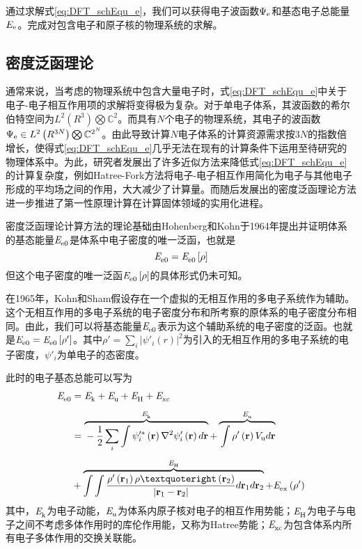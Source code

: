 通过求解式\ref{eq:DFT_schEqu_e}，我们可以获得电子波函数$\Psi_{\rm e}$和基态电子总能量$E_{\rm e}$。完成对包含电子和原子核的物理系统的求解。

\subsection{密度泛函理论} 
通常来说，当考虑的物理系统中包含大量电子时，式\ref{eq:DFT_schEqu_e}中关于电子-电子相互作用项的求解将变得极为复杂。对于单电子体系，其波函数的希尔伯特空间为$L^2\left(R^3\right)\bigotimes \mathbb{C}^2$。而具有$N$个电子的物理系统，其电子的波函数$\Psi_{\rm e}\in L^2\left(R^{3N}\right)\bigotimes \mathbb{C}^{2^N}$。由此导致计算$N$电子体系的计算资源需求按$3N$的指数倍增长，使得式\ref{eq:DFT_schEqu_e}几乎无法在现有的计算条件下运用至待研究的物理体系中。为此，研究者发展出了许多近似方法来降低式\ref{eq:DFT_schEqu_e}的计算复杂度，例如Hatree-Fork方法将电子-电子相互作用简化为电子与其他电子形成的平均场之间的作用，大大减少了计算量。而随后发展出的密度泛函理论方法进一步推进了第一性原理计算在计算固体领域的实用化进程。

密度泛函理论计算方法的理论基础由Hohenberg和Kohn于1964年提出并证明\chinesecolon 体系的基态能量$\it E_{\rm e0}^{\rm } \it$是体系中电子密度的唯一泛函，也就是
\[
    \it E_{\rm e0}^{\rm } \it=\it E_{\rm e0}^{\rm } \it\left[\rho\right]
\]
但这个电子密度的唯一泛函$\it E_{\rm e0}^{\rm } \it\left[\rho\right]$的具体形式仍未可知。

在1965年，Kohn和Sham假设存在一个虚拟的无相互作用的多电子系统作为辅助。这个无相互作用的多电子系统的电子密度分布和所考察的原体系的电子密度分布相同。由此，我们可以将基态能量$\it E_{\rm e0}^{\rm } \it$表示为这个辅助系统的电子密度的泛函。也就是$\it E_{\rm e0}^{\rm } \it=\it E_{\rm e0}^{\rm } \it\left[\rho'\right]$。其中$\rho'=\sum_i\left\lvert \psi' _i\left(r\right)\right\rvert^2$为引入的无相互作用的多电子系统的电子密度，$\psi'_i$为单电子的态密度。

此时的电子基态总能可以写为\chinesecolon
\begin{equation}
    \label{eq:DFT_Ee0_ks}
    \begin{split}
        \energyVar{e0}{}&=\energyVar{k}{}+\energyVar{u}{}+\energyVar{H}{}+\energyVar{xc}{}\\[+1ex]
        &=\overbrace{\rule[0ex]{0ex}{3.2ex}-\frac{1}{2}\sum_i\int\psi'^*_i\left({\bm r}\right)\nabla^2\psi'_i\left({\bm r}\right)d{\bm r}}^{\energyVar{k}{}} + \overbrace{\rule[0ex]{0ex}{3.2ex}\int\rho'\left({\bm r}\right)V_{\rm u}d{\bm r}}^{\energyVar{u}{}}\\[+1ex]
        &+\overbrace{\int\int \frac{\rho'\left({\bm r}_1\right)\rho’\left({\bm r}_2\right)}{\left\lvert{\bm r}_1 - {\bm r}_2\right\rvert}d{\bm r}_1d{\bm r}_2}^{\energyVar{H}{}}+\energyVar{ex}{}\left(\rho'\right)
    \end{split}
\end{equation}
其中，$\it E_{\rm k}^{\rm } \it$为电子动能，$\it E_{\rm u}^{\rm } \it$为体系内原子核对电子的相互作用势能；$\it E_{\rm H}^{\rm } \it$为电子与电子之间不考虑多体作用时的库伦作用能，又称为Hatree势能；$\it E_{\rm xc}^{\rm } \it$为包含体系内所有电子多体作用的交换关联能。

